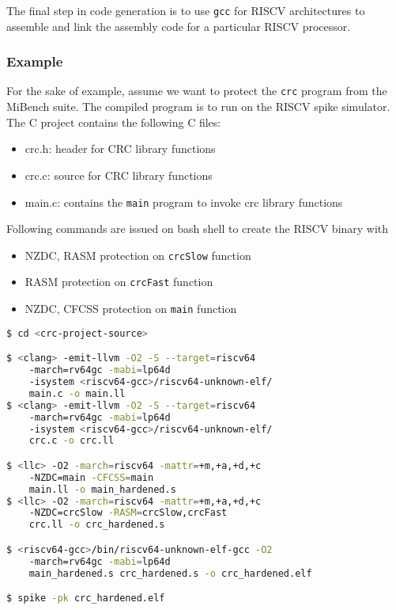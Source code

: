 The final step in code generation is to use \texttt{gcc} for RISCV architectures to assemble and link the
assembly code for a particular RISCV processor.

\subsubsection{Example}
For the sake of example, assume we want to protect the \texttt{crc} program from the MiBench suite. The
compiled program is to run on the RISCV spike simulator. The C project contains the following C files:

\begin{itemize}
 \item{crc.h: header for CRC library functions}
 \item{crc.c: source for CRC library functions}
 \item{main.c: contains the \texttt{main} program to invoke crc library functions}
\end{itemize}

Following commands are issued on bash shell to create the RISCV binary with
\begin{itemize}
 \item NZDC, RASM protection on \texttt{crcSlow} function
 \item RASM protection on \texttt{crcFast} function
 \item NZDC, CFCSS protection on \texttt{main} function
\end{itemize}

\begin{framed}
 \begin{lstlisting}[language=bash, basicstyle=\small\ttfamily]
$ cd <crc-project-source>

$ <clang> -emit-llvm -O2 -S --target=riscv64
    -march=rv64gc -mabi=lp64d
    -isystem <riscv64-gcc>/riscv64-unknown-elf/
    main.c -o main.ll
$ <clang> -emit-llvm -O2 -S --target=riscv64
    -march=rv64gc -mabi=lp64d
    -isystem <riscv64-gcc>/riscv64-unknown-elf/
    crc.c -o crc.ll

$ <llc> -O2 -march=riscv64 -mattr=+m,+a,+d,+c
    -NZDC=main -CFCSS=main
    main.ll -o main_hardened.s
$ <llc> -O2 -march=riscv64 -mattr=+m,+a,+d,+c
    -NZDC=crcSlow -RASM=crcSlow,crcFast
    crc.ll -o crc_hardened.s

$ <riscv64-gcc>/bin/riscv64-unknown-elf-gcc -O2
    -march=rv64gc -mabi=lp64d
    main_hardened.s crc_hardened.s -o crc_hardened.elf

$ spike -pk crc_hardened.elf

\end{lstlisting}
\end{framed}


